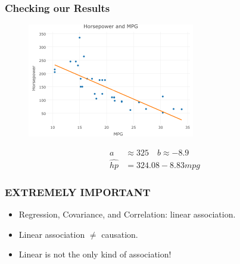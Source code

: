\documentclass{beamer}
\begin{document}
\begin{frame}
\frametitle{Checking our Results}
	\begin{figure}
		\includegraphics[width = 0.65\textwidth]{./images/carsFitted.png}
	\end{figure}
	\begin{align*}
		a &\approx 325 \quad b \approx -8.9
		\\
		\widehat{hp} &= 324.08 - 8.83 mpg
	\end{align*}
\end{frame}

\begin{frame}
\frametitle{\alert{EXTREMELY IMPORTANT}}
	\begin{itemize}
		\item Regression, Covariance, and Correlation: linear association.
		\item Linear association $\neq$ causation. 
		\item Linear is not the only kind of association!
	\end{itemize}
\end{frame}
\end{document}
